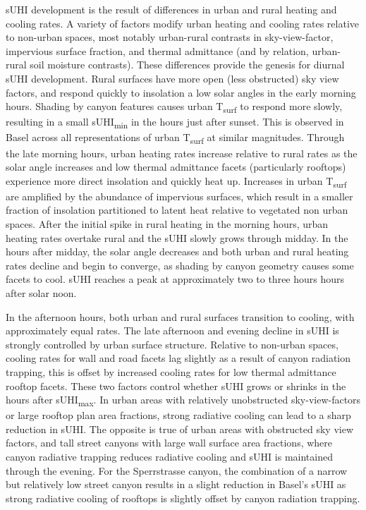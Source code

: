 \begin{bibunit}
sUHI development is the result of differences in urban and rural heating and cooling rates. A variety of factors modify urban heating and cooling rates relative to non-urban spaces, most notably urban-rural contrasts in sky-view-factor, impervious surface fraction, and thermal admittance (and by relation, urban-rural soil moisture contrasts). These differences provide the genesis for diurnal sUHI development. Rural surfaces have more open (less obstructed) sky view factors, and respond quickly to insolation a low solar angles in the early morning hours. Shading by canyon features causes urban T\textsubscript{surf} to respond more slowly, resulting in a small sUHI\textsubscript{min} in the hours just after sunset. This is observed in Basel across all representations of urban T\textsubscript{surf} at similar magnitudes. Through the late morning hours, urban heating rates increase relative to rural rates as the solar angle increases and low thermal admittance facets (particularly rooftops) experience more direct insolation and quickly heat up. Increases in urban T\textsubscript{surf} are amplified by the abundance of impervious surfaces, which result in a smaller fraction of insolation partitioned to latent heat relative to vegetated non urban spaces. After the initial spike in rural heating in the morning hours, urban heating rates overtake rural and the sUHI slowly grows through midday. In the hours after midday, the solar angle decreases and both urban and rural heating rates decline and begin to converge, as shading by canyon geometry causes some facets to cool. sUHI reaches a peak at approximately two to three hours hours after solar noon. 

In the afternoon hours, both urban and rural surfaces transition to cooling, with approximately equal rates. The late afternoon and evening decline in sUHI is strongly controlled by urban surface structure. Relative to non-urban spaces, cooling rates for wall and road facets lag slightly as a result of canyon radiation trapping, this is offset by increased cooling rates for low thermal admittance rooftop facets. These two factors control whether sUHI grows or shrinks in the hours after sUHI\textsubscript{max}. In urban areas with relatively unobstructed sky-view-factors or large rooftop plan area fractions, strong radiative cooling can lead to a sharp reduction in sUHI. The opposite is true of urban areas with obstructed sky view factors, and tall street canyons with large wall surface area fractions, where canyon radiative trapping reduces radiative cooling and sUHI is maintained through the evening. For the Sperrstrasse canyon, the combination of a narrow but relatively low street canyon results in a slight reduction in Basel's sUHI as strong radiative cooling of rooftops is slightly offset by canyon radiation trapping. 
 

\end{bibunit}
